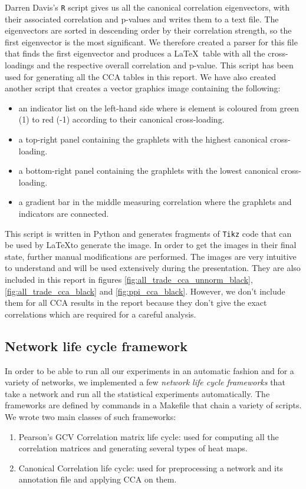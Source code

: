 Darren Davis's \lstinline|R| script gives us all the canonical correlation eigenvectors, with their associated correlation and p-values and writes them to a text file. The eigenvectors are sorted in descending order by their correlation strength, so the first eigenvector is the most significant. We therefore created a parser for this file that finds the first eigenvector and produces a \LaTeX\ table with all the cross-loadings and the respective overall correlation and p-value. This script has been used for generating all the CCA tables in this report. We have also created another script that creates a vector graphics image containing the following:
\begin{itemize}
 \item an indicator list on the left-hand side where is element is coloured from green (1) to red (-1) according to their canonical cross-loading.
 \item a top-right panel containing the graphlets with the highest canonical cross-loading.
 \item a bottom-right panel containing the graphlets with the lowest canonical cross-loading.
 \item a gradient bar in the middle measuring correlation where the graphlets and indicators are connected.
\end{itemize}

This script is written in Python and generates fragments of \lstinline|Tikz| code that can be used by \LaTeX to generate the image. In order to get the images in their final state, further manual modifications are performed. The images are very intuitive to understand and will be used extensively during the presentation. They are also included in this report in figures \ref{fig:all_trade_cca_unnorm_black}, \ref{fig:all_trade_cca_black} and \ref{fig:ppi_cca_black}. However, we don't include them for all CCA results in the report because they don't give the exact correlations which are required for a careful analysis.

\subsection{Network life cycle framework}
\label{sec:life-cycle_framework}
In order to be able to run all our experiments in an automatic fashion and for a variety of networks, we implemented a few \emph{network life cycle frameworks} that take a network and run all the statistical experiments automatically. The frameworks are defined by commands in a Makefile that chain a variety of scripts. We wrote two main classes of such frameworks: 
\begin{enumerate}
 \item Pearson's GCV Correlation matrix life cycle: used for computing all the correlation matrices and generating several types of heat maps.
 \item Canonical Correlation life cycle: used for preprocessing a network and its annotation file and applying CCA on them.
\end{enumerate}

